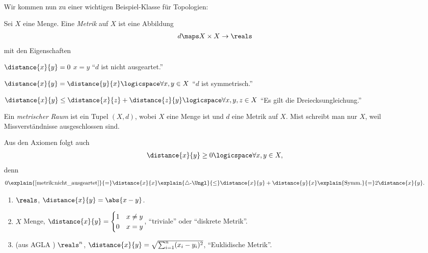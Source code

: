 Wir kommen nun zu einer wichtigen Beispiel-Klasse für Topologien:
\begin{definition}
    Sei \( X \) eine Menge. Eine \emph{Metrik} auf \( X \) ist eine Abbildung
    \begin{align*}
        d\maps X\times X \to \reals
    \end{align*}
    mit den Eigenschaften
    \begin{eigenschaftenenumerate}
        \item \label{metrik:nicht_ausgeartet}\( \distance{x}{y}=0 \) \tiff \( x=y \) \enquote{\( d \) ist nicht ausgeartet.}
        \item \label{metrik:symmetrisch}\( \distance{x}{y}=\distance{y}{x}\logicspace\forall x,y \in X \) \enquote{\( d \) ist symmetrisch.}
        \item \label{metrik:dreiecksungleichung} \( \distance{x}{y}\leq \distance{x}{z}+\distance{z}{y} \logicspace\forall x,y,z\in X\) \enquote{Es gilt die Dreiecksungleichung.} 
    \end{eigenschaftenenumerate}
    Ein \emph{metrischer Raum} ist ein Tupel \( (X,d) \), wobei \( X \) eine Menge ist und \( d \) eine Metrik auf \( X \). Mist schreibt man nur \( X \), weil Missverständnisse ausgeschlossen sind.
\end{definition}
\begin{bemerkung*}
    Aus den Axiomen folgt auch
    \begin{align*}
        \distance{x}{y}\geq 0 \logicspace \forall x,y \in X,
    \end{align*}
    denn
    \begin{align*}
        0\explain{\ref{metrik:nicht_ausgeartet}}{=}\distance{x}{x}\explain{\triangle\text{-\Ungl}}{\leq}\distance{x}{y}+\distance{y}{x}\explain{\text{Symm.}}{=}2\distance{x}{y}.
    \end{align*}
\end{bemerkung*}
\begin{beispiele*}
    \begin{enumerate}[label=\rechtsklammer{\roman*}, ref=\rechtsklammer{\roman*}]
        \item \label{metrik:beispiele:r}\( \reals \), \( \distance{x}{y}=\abs{x-y} \).
        \item \label{metrik:beispiele:diskret}\( X \) Menge, \( \distance{x}{y}=\begin{cases}
            1 & x\neq y\\
            0 & x=y
        \end{cases}
         \), \enquote{triviale} oder \enquote{diskrete Metrik}.
         
         \item\label{metrik:beispiele:r_n} (aus AGLA ) \( \reals^n \), \( \distance{x}{y}=\sqrt{\sum_{i=1}^{n} (x_i-y_i)^2} \), \enquote{Euklidische Metrik}.
    \end{enumerate}
\end{beispiele*}
